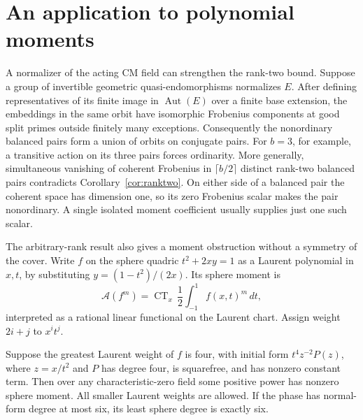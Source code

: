 \section{An application to polynomial moments}

A normalizer of the acting CM field can strengthen the rank-two
bound. Suppose a group of invertible geometric quasi-endomorphisms normalizes
\(E\). After defining representatives of its finite image in
\(\operatorname{Aut}(E)\) over a finite base extension, the
embeddings in the same orbit have isomorphic Frobenius components
at good split primes outside finitely many exceptions.
Consequently the nonordinary balanced pairs form a union of orbits
on conjugate pairs. For \(b=3\), for example, a transitive action
on its three pairs forces ordinarity. More generally, simultaneous
vanishing of coherent Frobenius in \(\lceil b/2\rceil\) distinct
rank-two balanced pairs contradicts Corollary~\ref{cor:ranktwo}.
On either side of a balanced pair the coherent space has
dimension one, so its zero Frobenius scalar makes the pair
nonordinary. A single isolated moment coefficient usually supplies
just one such scalar.

The arbitrary-rank result also gives a moment obstruction without
a symmetry of the cover. Write \(f\) on the sphere quadric
\(t^2+2xy=1\) as a Laurent polynomial in \(x,t\), by substituting
\(y=(1-t^2)/(2x)\). Its sphere moment is
\[
 \mathcal A(f^m)=\operatorname{CT}_x\,\frac12
                       \int_{-1}^1 f(x,t)^m\,dt ,
\]
interpreted as a rational linear functional on the Laurent chart.
Assign weight \(2i+j\) to \(x^it^j\).

\begin{proposition}\label{prop:sextic}
Suppose the greatest Laurent weight of \(f\) is four, with
initial form \(t^4z^{-2}P(z)\), where \(z=x/t^2\) and \(P\)
has degree four, is squarefree, and has nonzero constant term.
Then over any characteristic-zero field some positive power
has nonzero sphere moment. All smaller Laurent weights are
allowed. If the phase has normal-form degree at most six,
its least sphere degree is exactly six.
\end{proposition}

